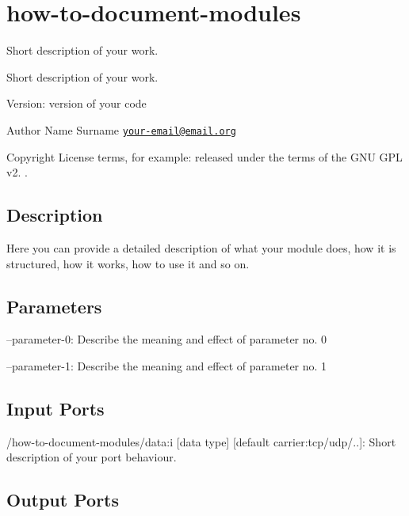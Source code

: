 \section{how-\/to-\/document-\/modules}
\label{group__how-to-document-modules}


Short description of your work.  


Short description of your work. 

Version\+: version of your code \begin{DoxyAuthor}{Author}
Name Surname \href{mailto:your-email@email.org}{\tt your-\/email@email.\+org} ~\newline
 
\end{DoxyAuthor}
\begin{DoxyCopyright}{Copyright}
License terms, for example\+: released under the terms of the G\+NU G\+PL v2. . 
\end{DoxyCopyright}
\hypertarget{group__how-to-document-modules_intro_sec}{}\subsection{Description}\label{group__how-to-document-modules_intro_sec}
Here you can provide a detailed description of what your module does, how it is structured, how it works, how to use it and so on.\hypertarget{group__how-to-document-modules_parameters_sec}{}\subsection{Parameters}\label{group__how-to-document-modules_parameters_sec}

\begin{DoxyItemize}
\item --parameter-\/0\+: Describe the meaning and effect of parameter no. 0
\item --parameter-\/1\+: Describe the meaning and effect of parameter no. 1 
\end{DoxyItemize}\hypertarget{group__how-to-document-modules_inputports_sec}{}\subsection{Input Ports}\label{group__how-to-document-modules_inputports_sec}

\begin{DoxyItemize}
\item /how-\/to-\/document-\/modules/data\+:i \mbox{[}data type\mbox{]} \mbox{[}default carrier\+:tcp/udp/..\mbox{]}\+: Short description of your port behaviour.
\end{DoxyItemize}\hypertarget{group__how-to-document-modules_outputports_sec}{}\subsection{Output Ports}\label{group__how-to-document-modules_outputports_sec}

